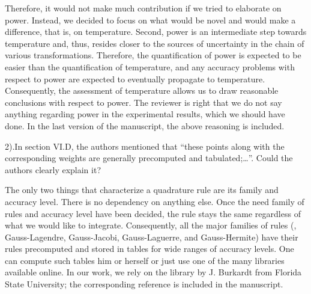\begin{authors}
Therefore, it would not make much contribution if we tried to elaborate on power.
Instead, we decided to focus on what would be novel and would make a difference, that is, on temperature.
Second, power is an intermediate step towards temperature and, thus, resides closer to the sources of uncertainty in the chain of various transformations.
Therefore, the quantification of power is expected to be easier than the quantification of temperature, and any accuracy problems with respect to power are expected to eventually propagate to temperature.
Consequently, the assessment of temperature allows us to draw reasonable conclusions with respect to power.
The reviewer is right that we do not say anything regarding power in the experimental results, which we should have done.
In the last version of the manuscript, the above reasoning is included.
\end{authors}

\begin{reviewer}
2).In section VI.D, the authors mentioned that ``these points along with the corresponding weights are generally precomputed and tabulated;\ldots''. Could the authors clearly explain it?
\end{reviewer}
\begin{authors}
The only two things that characterize a quadrature rule are its family and accuracy level.
There is no dependency on anything else.
Once the need family of rules and accuracy level have been decided, the rule stays the same regardless of what we would like to integrate.
Consequently, all the major families of rules (\eg, Gauss-Lagendre, Gauss-Jacobi, Gauss-Laguerre, and Gauss-Hermite) have their rules precomputed and stored in tables for wide ranges of accuracy levels.
One can compute such tables him or herself or just use one of the many libraries available online.
In our work, we rely on the library by J. Burkardt from Florida State University; the corresponding reference is included in the manuscript.
\end{authors}

